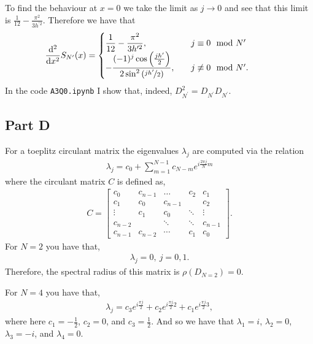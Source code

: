 \documentclass[12pt]{article}
\begin{document}
To find the behaviour at $x=0$ we take the limit as $j\to 0$ and see that this limit is $\frac{1}{12}-\frac{\pi^{2}}{3h^{\prime 2}}$. Therefore 
we have that 
\begin{align}
    \hspace*{-1cm}\dv[2]{}{x}S_{N^{\prime}}(x) =
    \begin{cases}
    \dfrac{1}{12}-\dfrac{\pi^{2}}{3h^{\prime 2}},&\quad j \equiv 0 \mod N^{\prime}\\
    -\dfrac{(-1)^{j}\cos\left(\frac{jh^{\prime}}{2}\right)}{2\sin^{2}\left(\nicefrac{jh^{\prime}}{2}\right) },&\quad j\not\equiv 0 \mod N^{\prime}.
    \end{cases}
\end{align}
In the code \verb|A3Q0.ipynb| I show that, indeed, $D_{N^{\prime}}^{2} = D_{N^{\prime}}D_{N^{\prime}}$.

\subsection*{Part D}

For a toeplitz circulant matrix the eigenvalues $\lambda_{j}$ are computed via the relation
\begin{align}
	\lambda_{j} = c_{0} + \sum_{m=1}^{N-1} c_{N-m}e^{i\frac{2\pi j}{N}m}
\end{align}
where the circulant matrix $C$ is defined as,
\begin{align}
	C=
	\left[
		\begin{array}{ccccc}
			{c_{0}} & {c_{n-1}} & {\dots} & {c_{2}} & {c_{1}} \\ 
			{c_{1}} & {c_{0}} & {c_{n-1}} & {} & {c_{2}} \\ 
			{\vdots} & {c_{1}} & {c_{0}} & {\ddots} & {\vdots} \\ 
			{c_{n-2}} & {} & {\ddots} & {\ddots} & {c_{n-1}} \\ 
			{c_{n-1}} & {c_{n-2}} & {\cdots} & {c_{1}} & {c_{0}}
		\end{array}
	\right].
\end{align}
For $N = 2$ you have that, 
\begin{align}
	\lambda_{j} = 0, \ j = 0, 1.
\end{align}
Therefore, the spectral radius of this matrix is $\rho(D_{N=2}) = 0$.

For $N = 4$ you have that, 
\begin{align}
	\lambda_{j} = c_{3}e^{i\frac{\pi j}{2}} + c_{2}e^{i\frac{\pi j}{2}2} + c_{1}e^{i\frac{\pi j}{2}3},
\end{align}
where here $c_{1} = -\frac{1}{2}$, $c_{2} = 0$, and $c_{3} = \frac{1}{2}$.
And so we have that $\lambda_{1} = i$, $\lambda_{2} = 0$, $\lambda_{3} = -i$, and $\lambda_{4} = 0$. 
\end{document}
